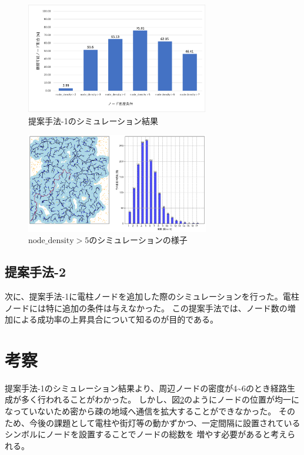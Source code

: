 \documentclass[a4paper, 9pt]{ltjsarticle}
\begin{document}
\begin{figure}[ht] %
  \centering
  \includegraphics[width=80mm]{提案1の結果.png}
  \caption{提案手法-1のシミュレーション結果}
  \label{fig:1} %
\end{figure}

\begin{figure}[ht]
  \centering
  \includegraphics[width=80mm]{simulation_result.png}
  \caption{$\mathrm{node\_density>5}$のシミュレーションの様子}
  \label{fig:2}
\end{figure}

\subsection{提案手法-2}
次に、提案手法-1に電柱ノードを追加した際のシミュレーションを行った。電柱ノードには特に追加の条件は与えなかった。
この提案手法では、ノード数の増加による成功率の上昇具合について知るのが目的である。


\section{考察}
提案手法-1のシミュレーション結果より、周辺ノードの密度が4\textasciitilde6のとき経路生成が多く行われることがわかった。
しかし、図\ref{fig:2}のようにノードの位置が均一になっていないため密から疎の地域へ通信を拡大することができなかった。
そのため、今後の課題として電柱や街灯等の動かずかつ、一定間隔に設置されているシンボルにノードを設置することでノードの総数を
増やす必要があると考えられる。
\end{document}
